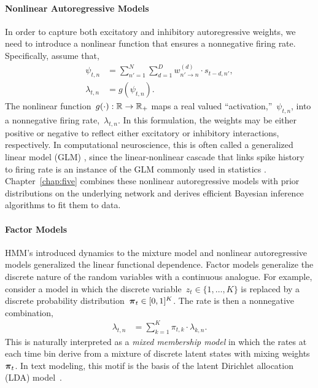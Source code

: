 \paragraph{Nonlinear Autoregressive Models}
In order to capture both excitatory and inhibitory autoregressive weights,
we need to introduce a nonlinear function that ensures a nonnegative firing 
rate. Specifically, assume that,
\begin{align*}
  \psi_{t,n} &= \sum_{n'=1}^N \sum_{d=1}^D w_{n' \to n}^{(d)} \cdot s_{t-d,n'}, \\
  \lambda_{t,n} &= g \left( \psi_{t,n} \right).
\end{align*}
The nonlinear function~${g(\cdot): \mathbb{R} \to \mathbb{R}_+}$ maps a real
valued ``activation,''~$\psi_{t,n}$, into a nonnegative firing
rate,~$\lambda_{t,n}$. 
In this formulation, the weights may be either
positive or negative to reflect either excitatory or inhibitory
interactions, respectively.  In computational neuroscience, this is
often called a generalized linear model (GLM) \citep{Paninski-2004,
  Truccolo-2005, Pillow-2008}, since the linear-nonlinear cascade
that links spike history to firing rate is an instance of the
GLM commonly used in statistics \citep{nelder1972generalized}.
Chapter~\ref{chap:five} combines these nonlinear autoregressive models
with prior distributions on the underlying network and derives
efficient Bayesian inference algorithms to fit them to data.

\paragraph{Factor Models}
HMM's introduced dynamics to the mixture model and nonlinear
autoregressive models generalized the linear functional dependence.
Factor models generalize the discrete nature of the random variables
with a continuous analogue. For example, consider a model in which the
discrete variable~${z_t \in \{1, \ldots, K\}}$ is replaced by a
discrete probability distribution~${\boldsymbol{\pi}_t \in [0,1]^K}$. The rate
is then a nonnegative combination,
\begin{align*}
  \lambda_{t,n} &= \sum_{k=1}^K \pi_{t,k} \cdot \lambda_{k,n}.
\end{align*}
This is naturally interpreted as a \emph{mixed membership model} in
which the rates at each time bin derive from a mixture of discrete
latent states with mixing weights~$\boldsymbol{\pi}_t$. In text modeling, this motif
is the basis of the latent Dirichlet allocation (LDA)
model~\citep{blei2003latent}.

